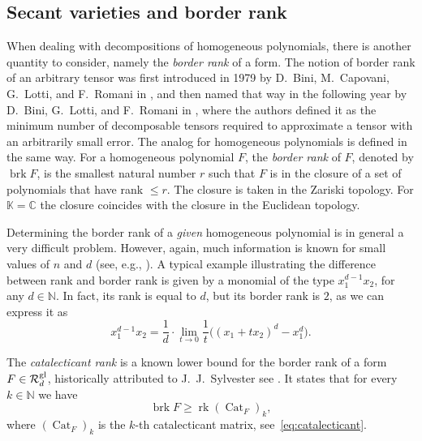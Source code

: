 \documentclass[a4paper,11pt,reqno]{amsart}
\newcommand{\calR}{\mathcal{R}}
\newcommand{\bbC}{\mathbb{C}}
\newcommand{\bbK}{\mathbb{K}}
\newcommand{\bbN}{\mathbb{N}}
\DeclareMathOperator{\brk}{brk}
\DeclareMathOperator{\Cat}{Cat}
\DeclareMathOperator{\rk}{rk}
\newcommand{\cftodo}[1]{\todo[color=darkred!40,bordercolor=darkred,size=\footnotesize]{\textbf{TODO: }#1}}
\newcommand{\oldtext}[1]{\textcolor{darkelectricblue}{#1}}
\newcommand{\cfchange}[1]{\textcolor{blue}{#1}}
\numberwithin{equation}{section}
\theoremstyle{definition}
\theoremstyle{plain}
\theoremstyle{remark}
\newcommand{\calRgl}{\calR^{\rm{gl}}}
\begin{document}
\subsection{Secant varieties and border rank}
\noindent When dealing with decompositions of homogeneous polynomials, there
is another quantity {to consider}, namely the
\textit{border rank} of a form.
The notion of border rank of an arbitrary tensor was {first introduced} in 1979 by D.~Bini, M.~Capovani, G.~Lotti, and F.~Romani in \cite{BCRL79}, and then named that way in the following year by D.~Bini, G.~Lotti, and F.~Romani in \cite{BLR80}, where the authors defined it as the minimum number
of decomposable tensors required to approximate a tensor with an arbitrarily
small error.
The analog for homogeneous polynomials is defined in the same way.
For a homogeneous polynomial ${F}$,
the \textit{border rank} of ${F}$, denoted by $\brk {F}$, is the smallest natural number $r$ such that ${F}$
is in the closure of a set of polynomials that have rank $\leq r$. The closure is taken in the Zariski topology. For $\bbK
= \bbC$ the closure {coincides} with the closure in the Euclidean topology.


Determining the border rank of a \emph{given} {homogeneous} polynomial is in general a very difficult problem.
However, again, much information is known for small values of $n$ and $d$
(see, e.g., \cites{LO13, CGLV22, GL19, LMR23, Fla23, GMR23}).
{A typical example illustrating} the difference between rank and border rank is given by a monomial of the type $x_1^{d-1}x_2$, for any $d\in\bbN$. {In fact, its rank is equal to} $d$, but its border rank is $2$, as we can express it as
\[
    x_1^{d-1}x_2=\frac{1}{d}\cdot \lim_{t\to 0}\frac{1}{t}\bigl((x_1+tx_2)^d-x_1^d\bigr).
\]

{The \textit{catalecticant rank} is a known} lower bound for the border
rank of a form ${F}\in\calRgl_d$, historically attributed to J.~J.~Sylvester
{see \cite{Syl51}}.%
It states that for every $k\in\bbN$ we have
\begin{equation}\label{rel:lower_bound_border_rank}
\brk {F}\geq \rk(\Cat_{{F}})_k,
\end{equation}
where $(\Cat_{{F}})_k$ is the $k$-th catalecticant matrix,
see~\eqref{eq:catalecticant}.
\end{document}
